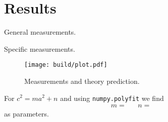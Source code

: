 \section{Results}
\label{sec:results}

\begin{table}
	\label{tab:general}
	\centering
	\caption{General measurements.}
	
\end{table}

\begin{table}
	\label{tab:specific}
	\centering
	\caption{Specific measurements.}
	
\end{table}

\begin{figure}[H]
	\label{fig:plot}
	\texttt{[image: build/plot.pdf]}
	\caption{Measurements and theory prediction.}
\end{figure}

For $c^2 = ma^2 + n$ and using \verb+numpy.polyfit+ \cite{numpy} we find
\begin{align*}
	m =  && n = 
\end{align*}
as parameters.
